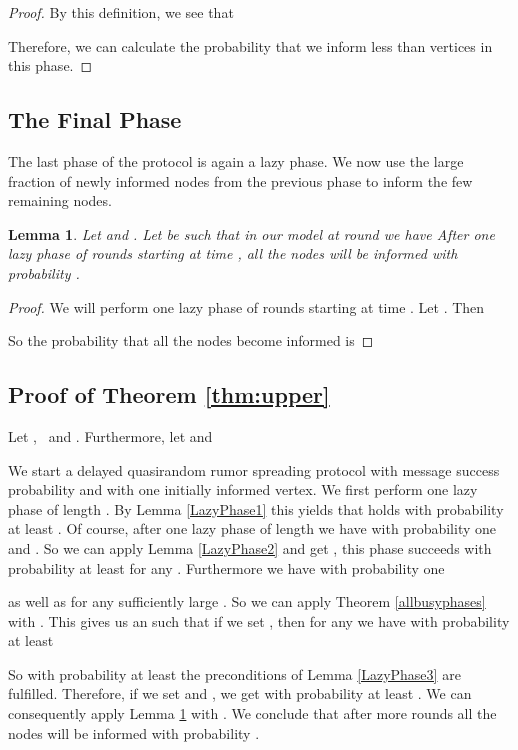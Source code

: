 \documentclass[12pt]{article}
\newtheorem{lemma}[theorem]{Lemma}
\begin{document}
{\begin{proof}
By this definition, we see that




Therefore, we can calculate the probability that we inform less than  vertices in this phase.


\end{proof}







\subsection{The Final Phase}

The last phase of the protocol is again a lazy phase. We now use the large fraction of newly informed nodes from the previous phase to inform the few remaining nodes.
\begin{lemma}\label{LazyPhase4}
Let  and .
Let  be such that in our model at round  we have 
 After one lazy phase of  rounds starting at time , all the nodes will be informed with probability .
\end{lemma}
\begin{proof}
We will perform one lazy phase of  rounds starting at time .
Let . Then

So the probability that all the nodes become informed is
 
\end{proof}


\subsection{Proof of Theorem \ref{thm:upper}}

Let ,~ and .
Furthermore, let 
 and 


We start a delayed quasirandom rumor spreading protocol with message success probability  and with one initially informed vertex. We first perform one lazy phase of length . By Lemma \ref{LazyPhase1} this yields that
 holds with probability at least . 
Of course, after one lazy phase of length  we have with probability one  and . So we can apply Lemma \ref{LazyPhase2} and get , this phase succeeds with probability at least  for any . 
Furthermore we have with probability one

as well as  for any sufficiently large . 
So we can apply Theorem \ref{allbusyphases} with . This gives us an  such that if we set , then for any  we have with probability at least  

So with probability at least  the preconditions of Lemma \ref{LazyPhase3} are fulfilled. Therefore, if we set  and , we get
 with probability at least .
We can consequently apply Lemma \ref{LazyPhase4} with . We conclude that after  more rounds all the nodes will be informed with probability  .

}
\end{document}
